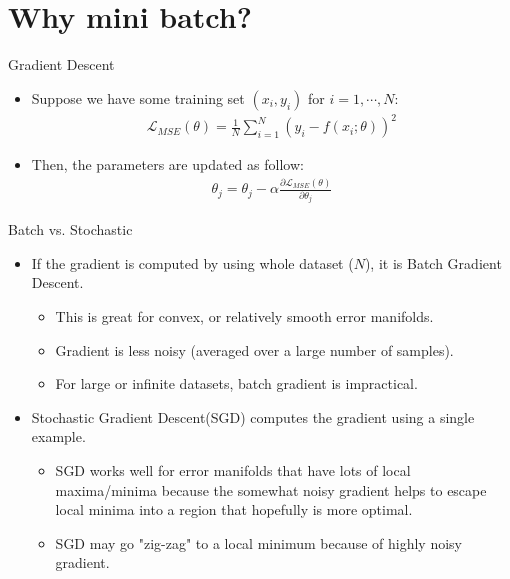 \section{Why mini batch?}

\begin{frame}{Gradient Descent}

\begin{itemize}
  \item{Suppose we have some training set $(x_i,y_i)$ for $i=1,\cdots,N$:}
    \begin{align*}
    \mathcal{L}_{MSE}(\theta)=\frac{1}{N}\sum_{i=1}^{N}(y_i-f(x_i;\theta))^2
    \end{align*}
    \item{Then, the parameters are updated as follow:}
        \begin{align*}
        \theta_j=\theta_j - \alpha\frac{\partial\mathcal{L}_{MSE}(\theta)}{\partial\theta_j}
        \end{align*}
        \end{itemize}
\end{frame}
        
\begin{frame}{Batch vs. Stochastic}  
  \begin{itemize}
    \item{If the gradient is computed by using whole dataset ($N$), it is Batch Gradient Descent. }
	\begin{itemize}
	\item {This is great for convex, or relatively smooth error manifolds.}
	\item{Gradient is less noisy (averaged over a large number of samples).}
	\item{For large or infinite datasets, batch gradient is impractical.}
	\end{itemize}
	\item{Stochastic Gradient Descent(SGD) computes the gradient using a single example.} 	    
	\begin{itemize}
	\item {SGD works well for error manifolds that have lots of local maxima/minima because the somewhat noisy gradient helps to escape local minima into a region that hopefully is more optimal.}
	\item {SGD may go "zig-zag" to a local minimum because of highly noisy gradient.} 
	\end{itemize}
  \end{itemize}
\end{frame}



